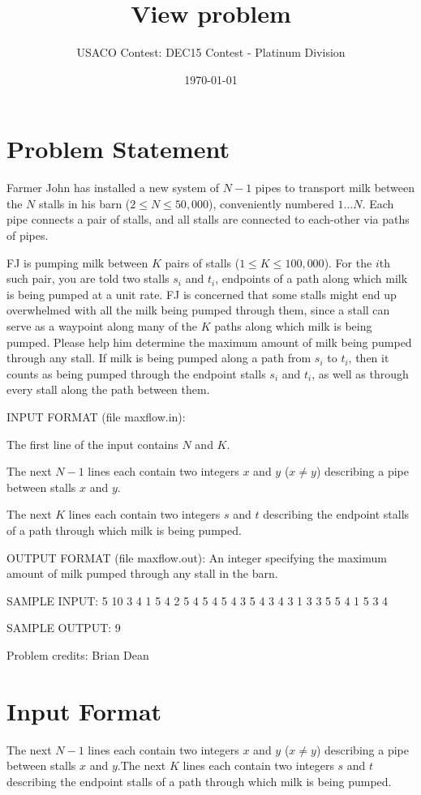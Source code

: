 \documentclass[12pt]{article}
\title{View problem}
\author{USACO Contest: DEC15 Contest - Platinum Division}
\date{\today}
\begin{document}
\maketitle

\section*{Problem Statement}

Farmer John has installed a new system of $N-1$ pipes to transport milk between
the $N$ stalls in his barn ($2 \leq N \leq 50,000$), conveniently numbered
$1 \ldots N$.  Each pipe connects a pair of stalls,  and all stalls are
connected to each-other via paths of pipes.  

FJ is pumping milk between $K$ pairs of stalls ($1 \leq K \leq 100,000$).  For
the $i$th such pair,  you are told two stalls $s_i$ and $t_i$, endpoints of a
path along which milk is being pumped at a unit rate.  FJ is concerned that some
stalls might end up overwhelmed with all the milk being pumped through them,
since a stall can serve as a waypoint along many of the $K$ paths along which
milk is being pumped.  Please help him determine the maximum amount of milk
being pumped through any stall.  If milk is being pumped along a path from $s_i$
to $t_i$, then it counts as being pumped through the endpoint stalls $s_i$ and
$t_i$, as well as through every stall along the path between them.

INPUT FORMAT (file maxflow.in):

The first line of the input contains $N$ and $K$.

The next $N-1$ lines each contain two integers $x$ and $y$ ($x \ne y$) describing a pipe
between stalls $x$ and $y$.

The next $K$ lines each contain two integers $s$ and $t$ describing the endpoint
stalls of a path through  which milk is being pumped.


OUTPUT FORMAT (file maxflow.out):
An integer specifying the maximum amount of milk pumped through any stall in the
barn.


SAMPLE INPUT:
5 10
3 4
1 5
4 2
5 4
5 4
5 4
3 5
4 3
4 3
1 3
3 5
5 4
1 5
3 4

SAMPLE OUTPUT: 
9

Problem credits: Brian Dean



\section*{Input Format}
The next $N-1$ lines each contain two integers $x$ and $y$ ($x \ne y$) describing a pipe
between stalls $x$ and $y$.The next $K$ lines each contain two integers $s$ and $t$ describing the endpoint
stalls of a path through  which milk is being pumped.
\end{document}
